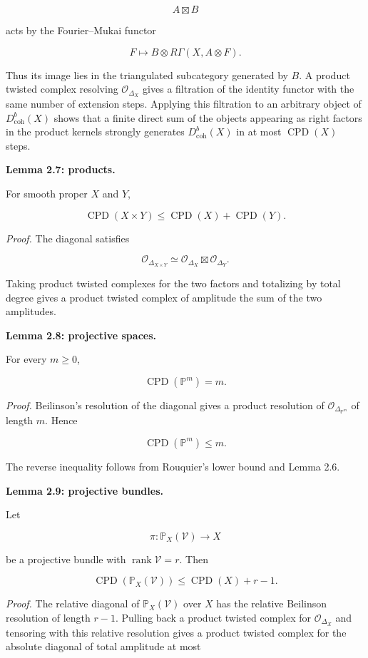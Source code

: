 \documentclass[11pt]{amsart}
\theoremstyle{definition}
\begin{document}
\[
A\boxtimes B
\]

acts by the Fourier--Mukai functor

\[
F\mapsto B\otimes R\Gamma(X,A\otimes F).
\]

Thus its image lies in the triangulated subcategory generated by $B$. A product twisted complex resolving $\mathcal O_{\Delta_X}$ gives a filtration of the identity functor with the same number of extension steps. Applying this filtration to an arbitrary object of $D^b_{\mathrm{coh}}(X)$ shows that a finite direct sum of the objects appearing as right factors in the product kernels strongly generates $D^b_{\mathrm{coh}}(X)$ in at most $\operatorname{CPD}(X)$ steps.

\noindent\textbf{Lemma 2.7: products.}

For smooth proper $X$ and $Y$,

\[
\operatorname{CPD}(X\times Y)
\le
\operatorname{CPD}(X)+\operatorname{CPD}(Y).
\]

\noindent\emph{Proof.} The diagonal satisfies

\[
\mathcal O_{\Delta_{X\times Y}}
\simeq
\mathcal O_{\Delta_X}\boxtimes\mathcal O_{\Delta_Y}.
\]

Taking product twisted complexes for the two factors and totalizing by total degree gives a product twisted complex of amplitude the sum of the two amplitudes.

\noindent\textbf{Lemma 2.8: projective spaces.}

For every $m\ge0$,

\[
\operatorname{CPD}(\mathbb P^m)=m.
\]

\noindent\emph{Proof.} Beilinson's resolution of the diagonal gives a product resolution of $\mathcal O_{\Delta_{\mathbb P^m}}$ of length $m$. Hence

\[
\operatorname{CPD}(\mathbb P^m)\le m.
\]

The reverse inequality follows from Rouquier's lower bound and Lemma 2.6.

\noindent\textbf{Lemma 2.9: projective bundles.}

Let

\[
\pi:\mathbb P_X(\mathcal V)\to X
\]

be a projective bundle with $\operatorname{rank}\mathcal V=r$. Then

\[
\operatorname{CPD}(\mathbb P_X(\mathcal V))
\le
\operatorname{CPD}(X)+r-1.
\]

\noindent\emph{Proof.} The relative diagonal of $\mathbb P_X(\mathcal V)$ over $X$ has the relative Beilinson resolution of length $r-1$. Pulling back a product twisted complex for $\mathcal O_{\Delta_X}$ and tensoring with this relative resolution gives a product twisted complex for the absolute diagonal of total amplitude at most
\end{document}
